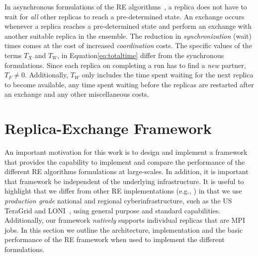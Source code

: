 \documentclass{rspublic}
\newcommand{\jhanote}[1]{ {\textcolor{red} { ***shantenu: #1 }}}
\newcommand{\alnote}[1]{ {\textcolor{blue} { ***andre: #1 }}}
\newcommand{\athotanote}[1]{ {\textcolor{green} { ***athota: #1 }}}
\newcommand{\alnote}[1]{}
\newcommand{\athotanote}[1]{}
\newcommand{\jhanote}[1]{}
\begin{document}
In asynchronous formulations of the RE
algorithms~\citep{parashar_arepex,DBLP:journals/jcc/GallicchioLP08}, a
replica does not have to wait for {\it all} other replicas to reach a
pre-determined state. An exchange occurs whenever a replica reaches a
pre-determined state and perform an exchange with another suitable
replica in the ensemble.  The reduction in {\it synchronization}
(wait) times comes at the cost of increased {\it coordination} costs.
The specific values of the terms $T_{X}$ and $T_W$, in
Equation\ref{eq:totaltime} differ from the synchronous formulations.
Since each replica on completing a run has to find a {\it new}
partner, $T_F \neq 0$.  Additionally, $T_W$ only includes the time
spent waiting for the next replica to become available, any time spent
waiting before the replicas are restarted after an exchange and any
other miscellaneous costs.




\section{Replica-Exchange Framework}\label{repexfw}

An important motivation for this work is to design and implement a
framework that provides the capability to implement and compare the
performance of the different RE algorithms formulations at
large-scales.  In addition, it is important that framework be
independent of the underlying infrastructure.  It is useful to
highlight that we differ from other RE implementations (e.g.,
\citep{parashar_arepex}) in that we use {\it production grade}
national and regional cyberinfrastructure, such as the US TeraGrid and
LONI~\citep{LONI_web}, using general purpose and standard
capabilities.  Additionally, our framework {\it natively} supports
individual replicas that are MPI jobs. In this section we outline the
architecture, implementation and the basic performance of the RE
framework when used to implement the different formulations.
\end{document}
